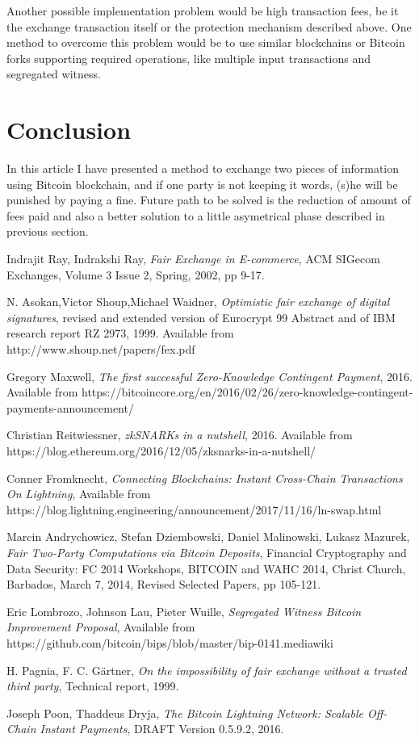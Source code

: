 \documentclass[]{article}
\begin{document}
Another possible implementation problem would be high transaction fees, be it the exchange transaction itself or the protection mechanism described above. One method to overcome this problem would be to use similar blockchains or Bitcoin forks supporting required operations, like multiple input transactions and segregated witness.

\section{Conclusion}

In this article I have presented a method to exchange two pieces of information using Bitcoin blockchain, and if one party is not keeping it words, (s)he will be punished by paying a fine. Future path to be solved is the reduction of amount of fees paid and also a better solution to a little asymetrical phase described in previous section.

\begin{thebibliography}{9}
	Indrajit Ray, Indrakshi Ray, 
	\textit{Fair Exchange in E-commerce},
	ACM SIGecom Exchanges, Volume 3 Issue 2, Spring, 2002,
	pp 9-17. 
	
	    N. Asokan,Victor Shoup,Michael Waidner,
	    \textit{Optimistic fair exchange of digital signatures},
	    revised and extended version of Eurocrypt 99 Abstract and of IBM research report RZ 2973, 1999. Available from http://www.shoup.net/papers/fex.pdf
		
	Gregory Maxwell,
	\textit{The first successful Zero-Knowledge Contingent Payment}, 2016.
	Available from https://bitcoincore.org/en/2016/02/26/zero-knowledge-contingent-payments-announcement/
	
	Christian Reitwiessner,
	\textit{zkSNARKs in a nutshell}, 2016.
	Available from
	https://blog.ethereum.org/2016/12/05/zksnarks-in-a-nutshell/
	
	Conner Fromknecht,
	\textit{Connecting Blockchains: Instant Cross-Chain Transactions On Lightning},
	Available from https://blog.lightning.engineering/announcement/2017/11/16/ln-swap.html
	
	Marcin Andrychowicz, Stefan Dziembowski, Daniel Malinowski, Lukasz Mazurek,
	\textit{Fair Two-Party Computations via Bitcoin Deposits}, Financial Cryptography and Data Security: FC 2014 Workshops, BITCOIN and WAHC 2014, Christ Church, Barbados, March 7, 2014, Revised Selected Papers, pp 105-121.
	
	Eric Lombrozo, Johnson Lau, Pieter Wuille,
	\textit{Segregated Witness Bitcoin Improvement Proposal},
	Available from https://github.com/bitcoin/bips/blob/master/bip-0141.mediawiki
	
	H. Pagnia, F. C. Gärtner, 
	\textit{On the impossibility of fair exchange without a trusted
	third party}, Technical report, 1999.

	Joseph Poon, Thaddeus Dryja,
	\textit{The Bitcoin Lightning Network: Scalable Off-Chain Instant Payments}, DRAFT Version 0.5.9.2, 2016.
	    
\end{thebibliography}
\end{document}
